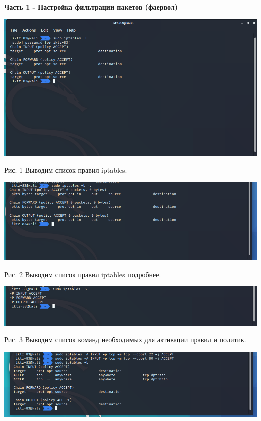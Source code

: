 \documentclass[a4paper,14pt]{extarticle}
\begin{document}
    \textbf{Часть 1 - Настройка фильтрации пакетов (фаервол)}
    \begin{center}

        \includegraphics[scale=0.5]{pics/1.png}

        Рис. 1 Выводим список правил iptables.
        \vspace{1ex}

        \includegraphics[scale=0.5]{pics/2.png}

        Рис. 2 Выводим список правил iptables подробнее.
        \vspace{1ex}

        \includegraphics[scale=0.5]{pics/3.png}

        Рис. 3 Выводим список команд необходимых для активации правил и политик.
        \vspace{1ex}

        \includegraphics[scale=0.5]{pics/4.png}


\end{center}
\end{document}
